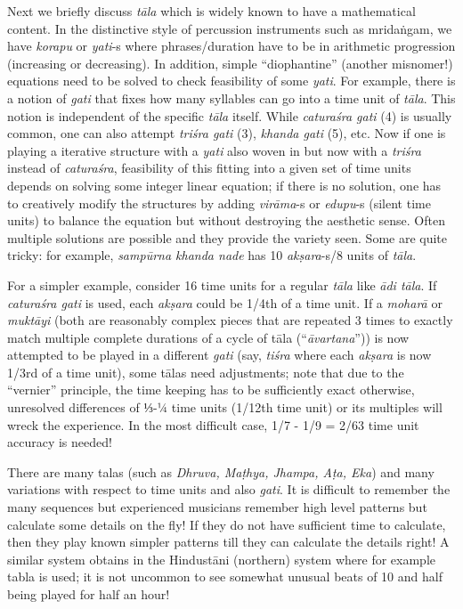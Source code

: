 Next we briefly discuss \textsl{tāla} which is widely known to have a mathematical content. In the distinctive style of percussion instruments such as mridaṅgam, we have \textsl{korapu} or \textsl{yati}-s where phrases/duration have to be in arithmetic progression (increasing or decreasing). In addition, simple “diophantine” (another misnomer!) equations need to be solved to check feasibility of some \textsl{yati}. For example, there is a notion of \textsl{gati} that fixes how many syllables can go into a time unit of \textsl{tāla}. This notion is independent of the specific \textsl{tāla} itself. While \textsl{caturaśra gati} (4) is usually common, one can also attempt \textsl{triśra gati} (3), \textsl{khanda gati} (5), etc. Now if one is playing a iterative structure with a \textsl{yati} also woven in but now with a \textsl{triśra} instead of \textsl{caturaśra}, feasibility of this fitting into a given set of time units depends on solving some integer linear equation; if there is no solution, one has to creatively modify the structures by adding \textsl{virāma}-s or \textsl{edupu}-s (silent time units) to balance the equation but without destroying the aesthetic sense. Often multiple solutions are possible and they provide the variety seen. Some are quite tricky: for example, \textsl{sampūrna khanda nade} has 10 \textsl{akṣara}-s/8 units of \textsl{tāla}.

For a simpler example, consider 16 time units for a regular \textsl{tāla} like \textsl{ādi tāla}. If \textsl{caturaśra gati} is used, each \textsl{akṣara} could be 1/4th of a time unit. If a \textsl{moharā} or \textsl{muktāyi} (both are reasonably complex pieces that are repeated 3 times to exactly match multiple complete durations of a cycle of tāla (“\textsl{āvartana}”)) is now attempted to be played in a different \textsl{gati} (say, \textsl{tiśra} where each \textsl{akṣara} is now 1/3rd of a time unit), some tālas need adjustments; note that due to the “vernier” principle, the time keeping has to be sufficiently exact otherwise, unresolved differences of ⅓-¼ time units (1/12th time unit) or its multiples will wreck the experience. In the most difficult case, 1/7 - 1/9 = 2/63 time unit accuracy is needed!

There are many talas (such as \textsl{Dhruva, Maṭhya, Jhampa, Aṭa, Eka}) and many variations with respect to time units and also \textsl{gati}. It is difficult to remember the many sequences but experienced musicians remember high level patterns but calculate some details on the fly! If they do not have sufficient time to calculate, then they play known simpler patterns till they can calculate the details right! A similar system obtains in the Hindustāni (northern) system where for example tabla is used; it is not uncommon to see somewhat unusual beats of 10 and half being played for half an hour! 


